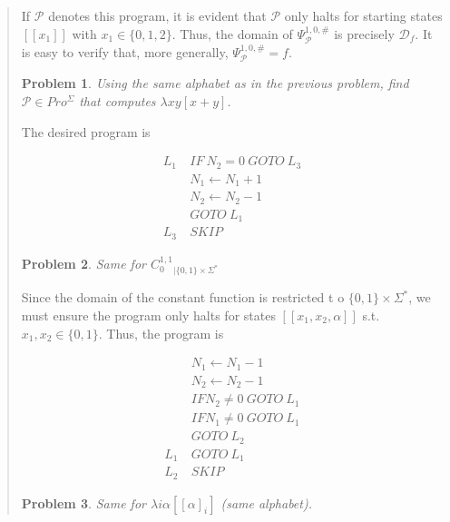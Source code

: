 \documentclass[a4paper, 12pt]{article}
\newtheorem{problem}{Problem}
\newtheorem{problem}{Problem}
\begin{document}
\begin{quote}
If $\mathcal{P}$ denotes this program, it is evident that $\mathcal{P}$ only
halts for starting states $[\![ x_1 ]\!]$ with $x_1 \in \{0, 1, 2\}$.
Thus, the domain of $\Psi_{\mathcal{P}}^{1, 0, \#}$ is precisely
$\mathcal{D}_f$. It is easy to verify that, more generally,
$\Psi_{\mathcal{P}}^{1, 0, \#} = f$.

\begin{problem}
    Using the same alphabet as in the previous problem, find $\mathcal{P} \in
    Pro^{\Sigma}$ that computes $\lambda xy[x + y]$.
\end{problem}

The desired program is 

\begin{align*}
    L_1 ~ &IF ~ N_2 = 0 ~ GOTO ~ L_3 \\ 
          &N_1 \leftarrow N_1 + 1 \\ 
          &N_2 \leftarrow N_2 - 1 \\ 
          &GOTO ~ L_1\\
    L_3 ~ & SKIP
\end{align*}

\begin{problem}
    Same for $C_0^{1, 1}_{\mid \{0, 1\} \times  \Sigma^{*}}$
\end{problem}

Since the domain of the constant function is restricted t o $\{0, 1\} \times
\Sigma^{*}$, we must ensure the program only halts for states $[\![ x_1, x_2,
\alpha ]\!]$ s.t. $x_1,x_2 \in \{0, 1\}$. Thus, the program is 

\begin{align*}
    &N_1 \leftarrow N_1 - 1 \\
    &N_2 \leftarrow N_2 - 1 \\
    &IF N_2 \neq 0 ~ GOTO ~ L_1 \\ 
    & IF N_1 \neq 0 ~ GOTO ~ L_1 \\ 
    &GOTO ~ L_2 \\ 
    L_1~& GOTO ~ L_1 \\ 
    L_2~ &SKIP
\end{align*}

\begin{problem}
    Same for $\lambda i\alpha[[\alpha]_i]$ (same alphabet).
\end{problem}


\end{quote}
\end{document}
